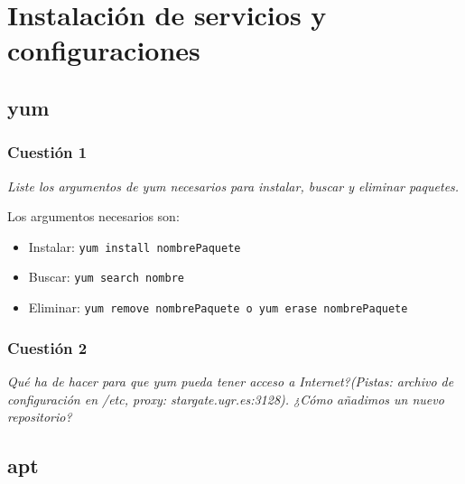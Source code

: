 



\maketitle %
\newpage %
\tableofcontents %
\listoffigures
\listoftables
\newpage


\section{Instalación de servicios y configuraciones}

\subsection{yum}
\subsubsection{Cuestión 1}
\textit{Liste los argumentos de yum necesarios para instalar, buscar y eliminar paquetes.}
\newline

Los argumentos necesarios son: \cite{manyum}
\begin{itemize}
  \item Instalar: \texttt{yum install nombrePaquete}
  \item Buscar: \texttt{yum search nombre}
  \item Eliminar: \texttt{yum remove nombrePaquete o yum erase nombrePaquete}
\end{itemize}


\subsubsection{Cuestión 2}
\textit{Qué ha de hacer para que yum pueda tener acceso a Internet?(Pistas: archivo de configuración en /etc, proxy: stargate.ugr.es:3128). ¿Cómo añadimos un nuevo repositorio?}
\newline


\subsection{apt}
